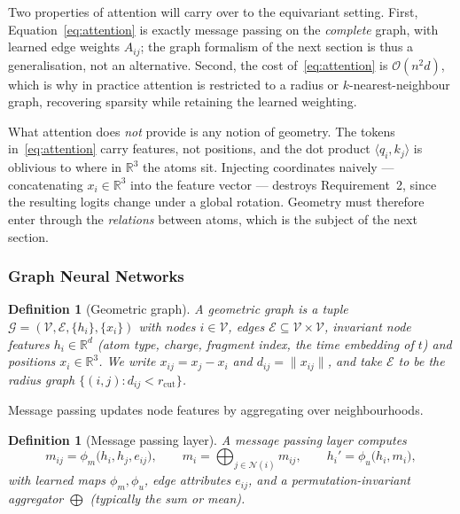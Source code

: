 \documentclass[a4paper,12pt]{article}
\newtheorem{definition}[theorem]{Definition}
\theoremstyle{remark}
\begin{document}
Two properties of attention will carry over to the equivariant setting. First,
Equation~\eqref{eq:attention} is exactly message passing on the \emph{complete} graph,
with learned edge weights $A_{ij}$; the graph formalism of the next section is thus a
generalisation, not an alternative. Second, the cost of~\eqref{eq:attention} is
$\mathcal O(n^2 d)$, which is why in practice attention is restricted to a radius or
$k$-nearest-neighbour graph, recovering sparsity while retaining the learned weighting.

What attention does \emph{not} provide is any notion of geometry. The tokens
in~\eqref{eq:attention} carry features, not positions, and the dot product
$\langle q_i,k_j\rangle$ is oblivious to where in $\mathbb R^3$ the atoms sit. Injecting
coordinates naively --- concatenating $x_i\in\mathbb R^3$ into the feature vector ---
destroys Requirement~2, since the resulting logits change under a global rotation.
Geometry must therefore enter through the \emph{relations} between atoms, which is the
subject of the next section.

\subsubsection{Graph Neural Networks}
\label{sec:gnn}

\begin{definition}[Geometric graph]
\label{def:geometric-graph}
A \emph{geometric graph} is a tuple $\mathcal G=(\mathcal V,\mathcal E,\{h_i\},\{x_i\})$ with nodes
$i\in\mathcal V$, edges $\mathcal E\subseteq\mathcal V\times\mathcal V$, invariant node features
$h_i\in\mathbb R^{d}$ (atom type, charge, fragment index, the time embedding of $t$) and
positions $x_i\in\mathbb R^3$. We write $x_{ij}=x_j-x_i$ and $d_{ij}=\|x_{ij}\|$, and take
$\mathcal E$ to be the radius graph $\{(i,j):d_{ij}<r_{\mathrm{cut}}\}$.
\end{definition}

Message passing updates node features by aggregating over neighbourhoods.

\begin{definition}[Message passing layer]
\label{def:mpnn}
A message passing layer computes
\begin{equation}
\label{eq:mpnn}
m_{ij}=\phi_m\bigl(h_i,h_j,e_{ij}\bigr),
\qquad
m_i=\bigoplus_{j\in\mathcal N(i)}m_{ij},
\qquad
h_i'=\phi_u\bigl(h_i,m_i\bigr),
\end{equation}
with learned maps $\phi_m,\phi_u$, edge attributes $e_{ij}$, and a permutation-invariant
aggregator $\bigoplus$ (typically the sum or mean).
\end{definition}
\end{document}
